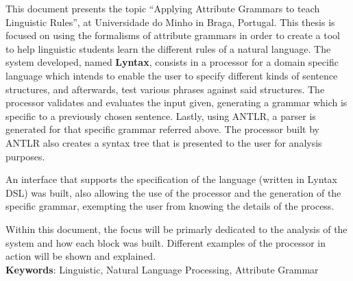 This document presents the topic “Applying Attribute Grammars to teach Linguistic Rules”, at Universidade do Minho in Braga, Portugal.
This thesis is focused on using the formalisms of attribute grammars in order to create a tool to help linguistic students learn the different rules of a natural language. 
The system developed, named \textbf{Lyntax}, consists in a processor for a domain specific language which intends to enable the user to specify different kinds of
sentence structures, and afterwards, test various phrases against said structures.
The processor validates and evaluates the input given, generating a grammar which is specific to a previously chosen sentence.
Lastly, using \textsc{ANTLR}, a parser is generated for that specific grammar referred above. The processor built by \textsc{ANTLR} also creates a syntax tree that is presented to the user for analysis purposes.

An interface that supports the specification of the language (written in Lyntax DSL) was built, also allowing the use of the processor and the generation of the specific grammar,
exempting the user from knowing the details of the process.

Within this document, the focus will be primarly dedicated to the analysis of the system and how each block was built.
Different examples of the processor in action will be shown and explained.\\[0.1cm]


\noindent \textbf{Keywords}: Linguistic, Natural Language Processing, Attribute Grammar